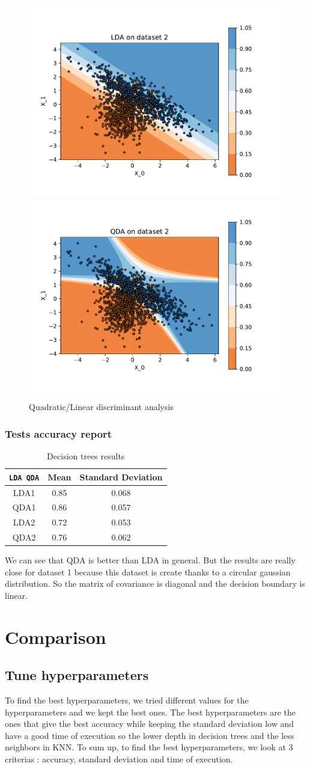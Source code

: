 \documentclass[12pt]{article}
\begin{document}
\begin{figure}[htp]
	\centering
	\includegraphics[width=.4\textwidth]{img/lda2.pdf}\quad
	\includegraphics[width=.4\textwidth]{img/qda2.pdf}\quad
	
	\caption{Quadratic/Linear discriminant analysis}
	\label{fig:qdalda}
\end{figure}
\subsubsection[]{Tests accuracy report}
	\begin{table}[!h]
		\centering
		\begin{tabular}{|c|c|c|}
		\hline
		\verb|LDA QDA| & Mean & Standard Deviation \\ \hline
		LDA1                                & 0.85 & 0.068              \\ \hline
		QDA1                                & 0.86 & 0.057              \\ \hline
		LDA2                                & 0.72 & 0.053              \\ \hline
		QDA2                                & 0.76 & 0.062              \\ \hline


		\end{tabular}
		\caption{Decision trees results}
		\label{tab:results-qdalda}
	\end{table}
We can see that QDA is better than LDA in general. But the results are really close for dataset 1 because this dataset is create thanks to a circular gaussian distribution. 
So the matrix of covariance is diagonal and the decision boundary is linear.
\section{Comparison}
\subsection[]{Tune hyperparameters}
To find the best hyperparameters, we tried different values for the hyperparameters and we kept the best ones.
The best hyperparameters are the ones that give the best accuracy while keeping the standard deviation low and have a good time of execution so the lower depth in decision trees and the less neighbors in KNN.
To sum up, to find the best hyperparameters, we look at 3 criterias : accuracy, standard deviation and time of execution.
\end{document}
